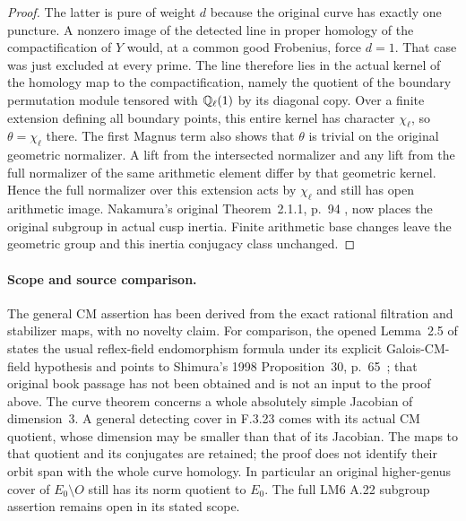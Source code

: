 \begin{proof}
The latter is pure of weight $d$ because the
original curve has exactly one puncture.
A nonzero image of the detected line in proper
homology of the compactification of $Y$ would,
at a common good Frobenius, force $d=1$.
That case was just excluded at every prime.
The line therefore lies in the actual kernel
of the homology map to the compactification,
namely the quotient of the boundary permutation
module tensored with $\mathbb Q_\ell(1)$ by its diagonal
copy. Over a finite extension defining all
boundary points, this entire kernel has character
$\chi_\ell$, so $\theta=\chi_\ell$ there.
The first Magnus term also shows that $\theta$
is trivial on the original geometric normalizer.
A lift from the intersected normalizer and any
lift from the full normalizer of the same
arithmetic element differ by that geometric
kernel. Hence the full normalizer over this
extension acts by $\chi_\ell$ and still has
open arithmetic image. Nakamura's original
Theorem~2.1.1, p.~94 \cite{AuditNakamura1994},
now places the original subgroup in actual
cusp inertia. Finite arithmetic base changes
leave the geometric group and this inertia
conjugacy class unchanged.
\end{proof}

\paragraph{Scope and source comparison.}
The general CM assertion has been derived from the exact
rational filtration and stabilizer maps, with no novelty
claim. For comparison, the opened Lemma~2.5 of
\cite{AuditGoodman2026} states the usual reflex-field
endomorphism formula under its explicit Galois-CM-field
hypothesis and points to Shimura's 1998 Proposition~30,
p.~65~\cite{AuditShimura1998Gate}; that original book passage has not been obtained
and is not an input to the proof above.
The curve theorem concerns a whole absolutely simple
Jacobian of dimension~3. A general detecting cover in
F.3.23 comes with its actual CM quotient, whose dimension
may be smaller than that of its Jacobian. The maps to
that quotient and its conjugates are retained; the
proof does not identify their orbit span with the whole
curve homology. In particular an original higher-genus
cover of $E_0\setminus O$ still has its norm quotient
to $E_0$. The full LM6 A.22 subgroup assertion remains
open in its stated scope.


